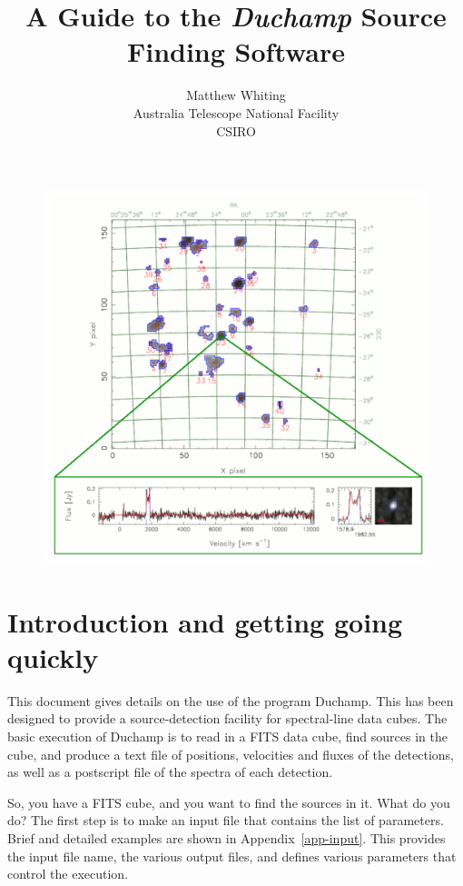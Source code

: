 \documentclass[12pt,a4paper]{article}
\title{A Guide to the {\it Duchamp} Source Finding Software}
\author{Matthew Whiting\\
Australia Telescope National Facility\\CSIRO}
\date{}
\begin{document}
\maketitle
\thispagestyle{empty}
\begin{figure}[!h]
\begin{center}
\includegraphics[width=\textwidth]{cover_image}
\end{center}
\end{figure}

\newpage
\tableofcontents

\newpage
\section{Introduction and getting going quickly}

This document gives details on the use of the program Duchamp. This
has been designed to provide a source-detection facility for
spectral-line data cubes. The basic execution of Duchamp is to read
in a FITS data cube, find sources in the cube, and produce a text
file of positions, velocities and fluxes of the detections, as well as
a postscript file of the spectra of each detection. 

So, you have a FITS cube, and you want to find the sources in it. What
do you do? The first step is to make an input file that contains the
list of parameters. Brief and detailed examples are shown in
Appendix~\ref{app-input}. This provides the input file name, the various
output files, and defines various parameters that control the
execution.
\end{document}
